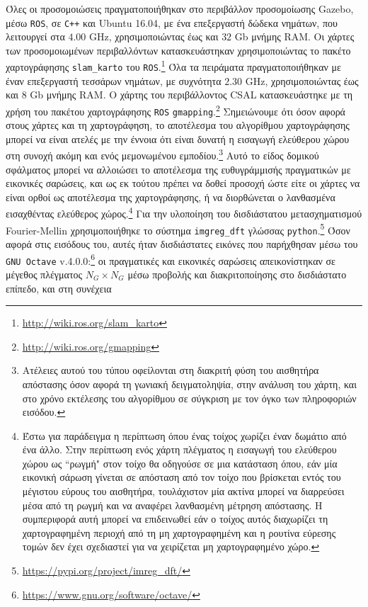 Όλες οι προσομοιώσεις πραγματοποιήθηκαν στο περιβάλλον προσομοίωσης Gazebo,
μέσω \texttt{ROS}, σε \texttt{C++} και Ubuntu 16.04, με ένα επεξεργαστή δώδεκα
νημάτων, που λειτουργεί στα $4.00$ GHz, χρησιμοποιώντας έως και $32$ Gb μνήμης
RAM. Οι χάρτες των προσομοιωμένων περιβαλλόντων κατασκευάστηκαν χρησιμοποιώντας
το πακέτο χαρτογράφησης \texttt{slam\_karto} του
\texttt{ROS}.\footnote{\url{http://wiki.ros.org/slam\_karto}} Όλα τα πειράματα
πραγματοποιήθηκαν με έναν επεξεργαστή τεσσάρων νημάτων, με συχνότητα $2.30$
GHz, χρησιμοποιώντας έως και $8$ Gb μνήμης RAM. Ο χάρτης του περιβάλλοντος CSAL
κατασκευάστηκε με τη χρήση του πακέτου χαρτογράφησης \texttt{ROS}
\texttt{gmapping}.\footnote{\url{http://wiki.ros.org/gmapping}} Σημειώνουμε ότι
όσον αφορά στους χάρτες και τη χαρτογράφηση, το αποτέλεσμα του αλγορίθμου
χαρτογράφησης μπορεί να είναι ατελές με την έννοια ότι είναι δυνατή η εισαγωγή
ελεύθερου χώρου στη συνοχή ακόμη και ενός μεμονωμένου
εμποδίου.\footnote{Ατέλειες αυτού του τύπου οφείλονται στη διακριτή φύση του
αισθητήρα απόστασης όσον αφορά τη γωνιακή δειγματοληψία, στην ανάλυση του
χάρτη, και στο χρόνο εκτέλεσης του αλγορίθμου σε σύγκριση με τον όγκο των
πληροφοριών εισόδου.} Αυτό το είδος δομικού σφάλματος μπορεί να αλλοιώσει το
αποτέλεσμα της ευθυγράμμισής πραγματικών με εικονικές σαρώσεις, και ως εκ
τούτου πρέπει να δοθεί προσοχή ώστε είτε οι χάρτες να είναι ορθοί ως αποτέλεσμα
της χαρτογράφησης, ή να διορθώνεται ο λανθασμένα εισαχθέντας ελεύθερος
χώρος.\footnote{Έστω για παράδειγμα η περίπτωση όπου ένας τοίχος χωρίζει έναν
δωμάτιο από ένα άλλο. Στην περίπτωση ενός χάρτη πλέγματος η εισαγωγή του
ελεύθερου χώρου ως ``ρωγμή" στον τοίχο θα οδηγούσε σε μια κατάσταση όπου, εάν
μία εικονική σάρωση γίνεται σε απόσταση από τον τοίχο που βρίσκεται εντός του
μέγιστου εύρους του αισθητήρα, τουλάχιστον μία ακτίνα μπορεί να διαρρεύσει μέσα
από τη ρωγμή και να αναφέρει λανθασμένη μέτρηση απόστασης. Η συμπεριφορά αυτή
μπορεί να επιδεινωθεί εάν ο τοίχος αυτός διαχωρίζει τη χαρτογραφημένη περιοχή
από τη μη χαρτογραφημένη και η ρουτίνα εύρεσης τομών δεν έχει σχεδιαστεί για να
χειρίζεται μη χαρτογραφημένο χώρο.} Για την υλοποίηση του δισδιάστατου
μετασχηματισμού Fourier-Mellin χρησιμοποιήθηκε το σύστημα \texttt{imgreg\_dft}
γλώσσας \texttt{python}.\footnote{\url{https://pypi.org/project/imreg\_dft/}}
Όσον αφορά στις εισόδους του, αυτές ήταν δισδιάστατες εικόνες που παρήχθησαν
μέσω του \texttt{GNU Octave}
v.4.0.0:\footnote{\url{https://www.gnu.org/software/octave/}} οι πραγματικές
και εικονικές σαρώσεις απεικονίστηκαν σε μέγεθος πλέγματος $N_G \times N_G$
μέσω προβολής και διακριτοποίησης στο δισδιάστατο επίπεδο, και στη συνέχεια
